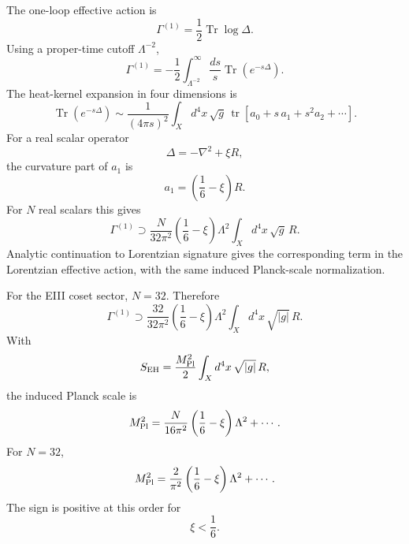 \documentclass[aps,prd,preprint,longbibliography,nofootinbib,superscriptaddress,floatfix]{revtex4-2}
\newcommand{\Tr}{\operatorname{Tr}}
\newcommand{\tr}{\operatorname{tr}}
\begin{document}
The one-loop effective action is
\begin{equation}
    \Gamma^{(1)}
    =
    \frac12 \Tr\log\Delta .
    \label{eq:induced_one_loop_action}
\end{equation}
Using a proper-time cutoff \(\Lambda^{-2}\),
\begin{equation}
    \Gamma^{(1)}
    =
    -\frac12
    \int_{\Lambda^{-2}}^\infty
    \frac{ds}{s}
    \Tr\left(e^{-s\Delta}\right).
    \label{eq:induced_proper_time}
\end{equation}
The heat-kernel expansion in four dimensions is
\begin{equation}
    \Tr\left(e^{-s\Delta}\right)
    \sim
    \frac{1}{(4\pi s)^2}
    \int_X d^4x\,\sqrt{g}\,
    \tr\left[
        a_0+s\,a_1+s^2a_2+\cdots
    \right].
    \label{eq:induced_heat_kernel}
\end{equation}
For a real scalar operator
\begin{equation}
    \Delta=-\nabla^2+\xi R ,
    \label{eq:induced_scalar_operator}
\end{equation}
the curvature part of \(a_1\) is
\begin{equation}
    a_1
    =
    \left(\frac16-\xi\right)R .
    \label{eq:induced_a1}
\end{equation}
For \(N\) real scalars this gives
\begin{equation}
    \Gamma^{(1)}
    \supset
    \frac{N}{32\pi^2}
    \left(\frac16-\xi\right)
    \Lambda^2
    \int_X d^4x\,\sqrt{g}\,R .
    \label{eq:induced_general_N}
\end{equation}
Analytic continuation to Lorentzian signature gives the corresponding term in
the Lorentzian effective action, with the same induced Planck-scale
normalization.

For the EIII coset sector, \(N=32\). Therefore
\begin{equation}
    \Gamma^{(1)}
    \supset
    \frac{32}{32\pi^2}
    \left(\frac16-\xi\right)
    \Lambda^2
    \int_X d^4x\,\sqrt{|g|}\,R .
    \label{eq:induced_eiii_result}
\end{equation}
With
\begin{equation}
    S_{\rm EH}
    =
    \frac{M_{\rm Pl}^2}{2}
    \int_X d^4x\,\sqrt{|g|}\,R ,
    \label{eq:induced_eh_normalization}
\end{equation}
the induced Planck scale is
\begin{equation}
    M_{\rm Pl}^2
    =
    \frac{N}{16\pi^2}
    \left(\frac16-\xi\right)\Lambda^2
    +
    \cdots .
    \label{eq:induced_planck_general}
\end{equation}
For \(N=32\),
\begin{equation}
    M_{\rm Pl}^2
    =
    \frac{2}{\pi^2}
    \left(\frac16-\xi\right)\Lambda^2
    +
    \cdots .
    \label{eq:induced_planck_32}
\end{equation}
The sign is positive at this order for
\begin{equation}
    \xi<\frac16 .
    \label{eq:induced_positive_condition}
\end{equation}
\end{document}
